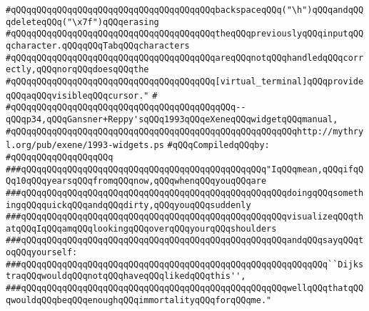 \verb|#qQQqqQQqqQQqqQQqqQQqqQQqqQQqqQQqqQQqqQQqbackspaceqQQq("\h")qQQqandqQQqdeleteqQQq("\x7f")qQQqerasing|\newline
\verb|#qQQqqQQqqQQqqQQqqQQqqQQqqQQqqQQqqQQqqQQqtheqQQqpreviouslyqQQqinputqQQqcharacter.qQQqqQQqTabqQQqcharacters|\newline
\verb|#qQQqqQQqqQQqqQQqqQQqqQQqqQQqqQQqqQQqqQQqareqQQqnotqQQqhandledqQQqcorrectly,qQQqnorqQQqdoesqQQqthe|\newline
\verb|#qQQqqQQqqQQqqQQqqQQqqQQqqQQqqQQqqQQqqQQq[virtual_terminal]qQQqprovideqQQqaqQQqvisibleqQQqcursor."|\newline
\verb|#|\newline
\verb|#qQQqqQQqqQQqqQQqqQQqqQQqqQQqqQQqqQQqqQQqqQQq--qQQqp34,qQQqGansner+Reppy'sqQQq1993qQQqeXeneqQQqwidgetqQQqmanual,|\newline
\verb|#qQQqqQQqqQQqqQQqqQQqqQQqqQQqqQQqqQQqqQQqqQQqqQQqqQQqqQQqhttp://mythryl.org/pub/exene/1993-widgets.ps|\newline
\newline
\verb|#qQQqCompiledqQQqby:|\newline
\verb|#qQQqqQQqqQQqqQQqqQQq|\newline
\newline
\newline
\newline
\newline
\newline
\newline
\verb|###qQQqqQQqqQQqqQQqqQQqqQQqqQQqqQQqqQQqqQQqqQQqqQQq"IqQQqmean,qQQqifqQQq10qQQqyearsqQQqfromqQQqnow,qQQqwhenqQQqyouqQQqare|\newline
\verb|###qQQqqQQqqQQqqQQqqQQqqQQqqQQqqQQqqQQqqQQqqQQqqQQqqQQqdoingqQQqsomethingqQQqquickqQQqandqQQqdirty,qQQqyouqQQqsuddenly|\newline
\verb|###qQQqqQQqqQQqqQQqqQQqqQQqqQQqqQQqqQQqqQQqqQQqqQQqqQQqvisualizeqQQqthatqQQqIqQQqamqQQqlookingqQQqoverqQQqyourqQQqshoulders|\newline
\verb|###qQQqqQQqqQQqqQQqqQQqqQQqqQQqqQQqqQQqqQQqqQQqqQQqqQQqandqQQqsayqQQqtoqQQqyourself:|\newline
\verb|###qQQqqQQqqQQqqQQqqQQqqQQqqQQqqQQqqQQqqQQqqQQqqQQqqQQqqQQqqQQq``DijkstraqQQqwouldqQQqnotqQQqhaveqQQqlikedqQQqthis'',|\newline
\verb|###qQQqqQQqqQQqqQQqqQQqqQQqqQQqqQQqqQQqqQQqqQQqqQQqqQQqwellqQQqthatqQQqwouldqQQqbeqQQqenoughqQQqimmortalityqQQqforqQQqme."|\newline
